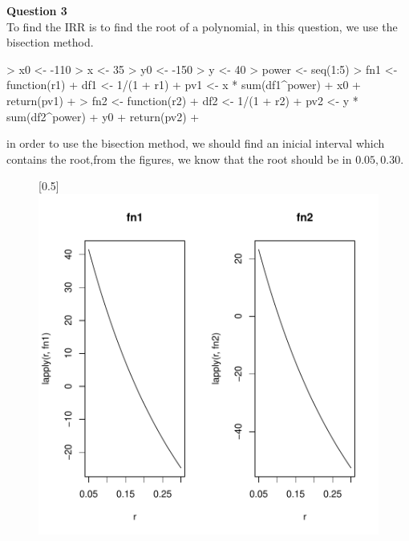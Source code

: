 \documentclass[a4paper,12pt]{article}
\begin{document}
\noindent\textbf{Question 3}\\

\noindent To find the IRR is to find the root of a  polynomial, in this question, we use the bisection method.
\begin{Schunk}
\begin{Sinput}
> x0 <- -110
> x <- 35
> y0 <- -150
> y <- 40
> power <- seq(1:5)
> fn1 <- function(r1) {
+     df1 <- 1/(1 + r1)
+     pv1 <- x * sum(df1^power) + x0
+     return(pv1)
+ }
> fn2 <- function(r2) {
+     df2 <- 1/(1 + r2)
+     pv2 <- y * sum(df2^power) + y0
+     return(pv2)
+ }
\end{Sinput}
\end{Schunk}
in order to use the bisection method, we should find an inicial interval which contains the root,from
the figures, we know that the root should be in ${0.05, 0.30}$.
\begin{figure}
\centering
\scalebox{1}[0.5]{\includegraphics{assign1-010}}
\end{figure}
\end{document}
